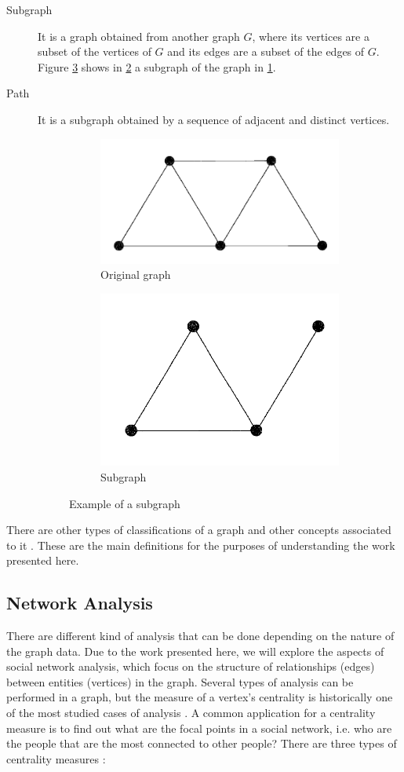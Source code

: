 \begin{description}
\item[Subgraph] It is a graph obtained from another graph $G$, where its vertices are a subset of the vertices of $G$ and its edges are a subset of the edges of $G$. Figure \ref{fig:figure9} shows in \ref{fig:figure9subfig2} a subgraph of the graph in \ref{fig:figure9subfig1}.
\item[Path] It is a subgraph obtained by a sequence of adjacent and distinct vertices.

\begin{figure}[ht]
\centering
\begin{subfigure}{.4\textwidth}
	\centering
	\includegraphics[width=.5\textwidth]{../subgraph_example_1.png}
	\caption{Original graph}
	\label{fig:figure9subfig1}
\end{subfigure} %
\begin{subfigure} {.4\textwidth}
	\centering
	\includegraphics[width=.5\textwidth]{../subgraph_example_2.png}
	\caption{Subgraph}
	\label{fig:figure9subfig2}
\end{subfigure}
\caption{Example of a subgraph \cite{Tobergte2013}}
\label{fig:figure9}
\end{figure}
\end{description}
There are other types of classifications of a graph and other concepts associated to it \cite{Tobergte2013}. These are the main definitions for the purposes of understanding the work presented here.

\subsection{Network Analysis}

There are different kind of analysis that can be done depending on the nature of the graph data. Due to the work presented here, we will explore the aspects of social network analysis, which focus on the structure of relationships (edges) between entities (vertices) in the graph. Several types of analysis can be performed in a graph, but the measure of a vertex's centrality is historically one of the most studied cases of analysis \cite{Freeman1978}. A common application for a centrality measure is to find out what are the focal points in a social network, i.e. who are the people that are the most connected to other people? There are three types of centrality measures \cite{Freeman1978}:

